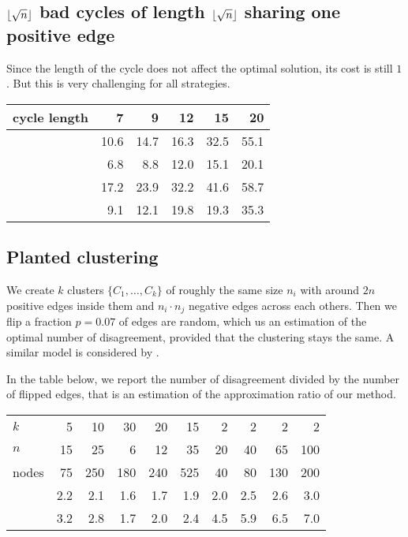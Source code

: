 \subsection{$\floor*{\sqrt{n}}$ bad cycles of length $\floor*{\sqrt{n}}$
	sharing one positive edge}
\label{sub:mixed}

Since the length of the cycle does not affect the optimal solution, its cost
is still $1$. But this is very challenging for all strategies.

\begin{center}
\begin{tabular}{lrrrrr}
\toprule
cycle length & 7    & 9    & 12   & 15   & 20 \\
\midrule
\pot{}       & 10.6 & 14.7 & 16.3 & 32.5 & 55.1 \\
\pat{}       & 6.8  & 8.8  & 12.0 & 15.1 & 20.1 \\
\nnot{}      & 17.2 & 23.9 & 32.2 & 41.6 & 58.7 \\
\nat{}       & 9.1  & 12.1 & 19.8 & 19.3 & 35.3 \\
\bottomrule
\end{tabular}
\end{center}


\subsection{Planted clustering}

We create $k$ clusters $\{C_1, \ldots, C_k\}$ of roughly the same size $n_i$
with around $2n$ positive edges inside them and $n_i\cdot n_j$ negative edges
across each others. Then we flip a fraction $p=0.07$ of edges are random,
which us an estimation of the optimal number of disagreement, provided that
the clustering stays the same. A similar model is considered by
\textcite{Makarychev2014}.

In the table below, we report the number of disagreement divided by the
number of flipped edges, that is an estimation of the approximation ratio of
our method.

\begin{center}
\begin{tabular}{lrrrrrrrrr}
\toprule
$k$      & 5   & 10  & 30  & 20  & 15  & 2   & 2   & 2   & 2  \\
$n$      & 15  & 25  & 6   & 12  & 35  & 20  & 40  & 65  & 100 \\
nodes    & 75  & 250 & 180 & 240 & 525 & 40  & 80  & 130 & 200 \\
\midrule
\pat{}   & 2.2 & 2.1 & 1.6 & 1.7 & 1.9 & 2.0 & 2.5 & 2.6 & 3.0 \\
\pot{}   & 3.2 & 2.8 & 1.7 & 2.0 & 2.4 & 4.5 & 5.9 & 6.5 & 7.0 \\
\bottomrule
\end{tabular}
\end{center}

